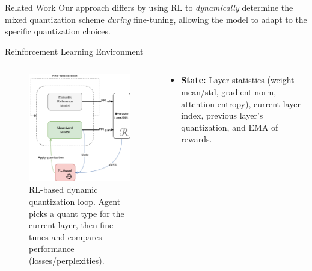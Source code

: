 \documentclass[final]{beamer}
\newlength{\colwidth}
\begin{document}
\begin{frame}[t]
\begin{columns}[t]
\begin{column}{\colwidth}
\begin{block}{Related Work}
					Our approach differs by using RL to \emph{dynamically} determine the mixed quantization scheme \emph{during} fine-tuning, allowing the model to adapt to the specific quantization choices.
					
				\end{block}
				
				
				\begin{block}{Reinforcement Learning Environment}
					\begin{columns}[T]
						\begin{column}{0.6\linewidth}
							\begin{figure}[ht]
								\centering
								\includegraphics[width=\linewidth]{dynaq-scheme.png}
								\caption{RL-based dynamic quantization loop. Agent picks a quant type for the current layer, then fine-tunes and compares performance (losses/perplexities).}
							\end{figure}
						\end{column}
						\begin{column}{0.4\linewidth}
							\begin{itemize}
								\item \textbf{State:} Layer statistics (weight mean/std, gradient norm, attention entropy), current layer index, previous layer's quantization, and EMA of rewards.

\end{itemize}
\end{column}
\end{columns}
\end{block}
\end{column}
\end{columns}
\end{frame}
\end{document}
